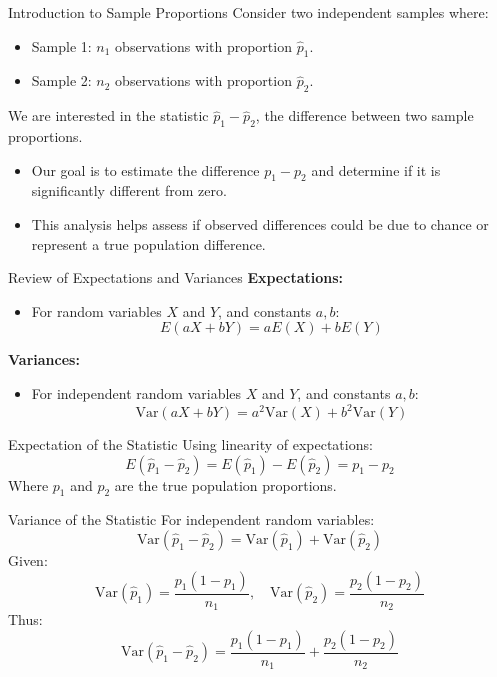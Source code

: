 \documentclass[handout]{beamer} %
\begin{document}
\begin{frame}{Introduction to Sample Proportions}
  Consider two independent samples where:
  \begin{itemize}
    \item Sample 1: $n_1$ observations with proportion $\hat{p}_1$.
    \item Sample 2: $n_2$ observations with proportion $\hat{p}_2$.
  \end{itemize}
  We are interested in the statistic $\hat{p}_1 - \hat{p}_2$, the difference between two sample proportions.
  \begin{itemize}
    \item Our goal is to estimate the difference $p_1 - p_2$ and determine if it is significantly different from zero.
    \item This analysis helps assess if observed differences could be due to chance or represent a true population difference.
  \end{itemize}
\end{frame}

\begin{frame}{Review of Expectations and Variances}
  \textbf{Expectations:}
  \begin{itemize}
    \item For random variables $X$ and $Y$, and constants $a, b$:
    \[
    E(aX + bY) = aE(X) + bE(Y)
    \]
  \end{itemize}
  \textbf{Variances:}
  \begin{itemize}
    \item For independent random variables $X$ and $Y$, and constants $a, b$:
    \[
    \text{Var}(aX + bY) = a^2\text{Var}(X) + b^2\text{Var}(Y)
    \]
  \end{itemize}
\end{frame}

\begin{frame}{Expectation of the Statistic}
  Using linearity of expectations:
  \[
  E(\hat{p}_1 - \hat{p}_2) = E(\hat{p}_1) - E(\hat{p}_2) = p_1 - p_2
  \]
  Where $p_1$ and $p_2$ are the true population proportions.
\end{frame}

\begin{frame}{Variance of the Statistic}
  For independent random variables:
  \[
  \text{Var}(\hat{p}_1 - \hat{p}_2) = \text{Var}(\hat{p}_1) + \text{Var}(\hat{p}_2)
  \]
  Given:
  \[
  \text{Var}(\hat{p}_1) = \frac{p_1(1 - p_1)}{n_1}, \quad \text{Var}(\hat{p}_2) = \frac{p_2(1 - p_2)}{n_2}
  \]
  Thus:
  \[
  \text{Var}(\hat{p}_1 - \hat{p}_2) = \frac{p_1(1 - p_1)}{n_1} + \frac{p_2(1 - p_2)}{n_2}
  \]
\end{frame}
\end{document}
